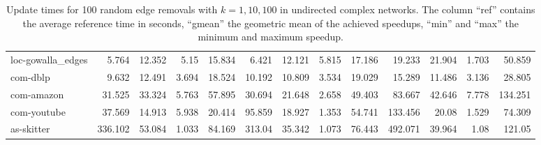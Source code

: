 \begin{landscape}
\begin{table}[h!]
\begin{tabular}{l|rrrr|rrrr|rrrr}
 loc-gowalla\_edges    &   5.764 &  12.352 &  5.15  &  15.834 &   6.421 &  12.121 &  5.815 &  17.186 &  19.233 &  21.904 &  1.703 &  50.859 \\
 com-dblp      &   9.632 &  12.491 &  3.694 &  18.524 &  10.192 &  10.809 &  3.534 &  19.029 &  15.289 &  11.486 &  3.136 &  28.805 \\
 com-amazon    &  31.525 &  33.324 &  5.763 &  57.895 &  30.694 &  21.648 &  2.658 &  49.403 &  83.667 &  42.646 &  7.778 & 134.251 \\
 com-youtube   &  37.569 &  14.913 &  5.938 &  20.414 &  95.859 &  18.927 &  1.353 &  54.741 & 133.456 &  20.08  &  1.529 &  74.309 \\
 as-skitter           & 336.102 &  53.084 &  1.033 &  84.169 & 313.04  &  35.342 &  1.073 &  76.443 & 492.071 &  39.964 &  1.08  & 121.05  \\
\bottomrule
\end{tabular}
\caption{Update times for 100 random edge removals with $k = 1, 10, 100$ in undirected complex networks. The column ``ref'' contains the average reference time in seconds, ``gmean'' the geometric mean of the achieved speedups, ``min'' and ``max'' the minimum and maximum speedup.}
\end{table}

\end{landscape}



